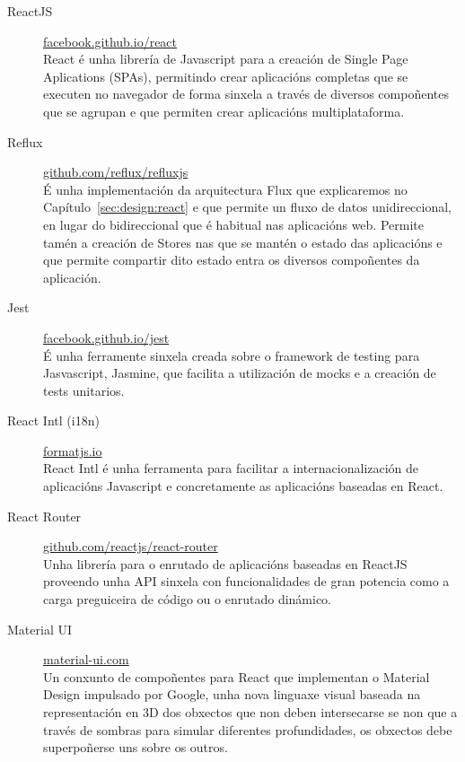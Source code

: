   \begin{description}
   \item [ReactJS] 
\href{https://facebook.github.io/react/}{facebook.github.io/react} \\ React é 
unha librería de Javascript para a 
creación de Single Page Aplications (SPAs)\cite{book:spas}, permitindo crear 
aplicacións 
completas que se executen no navegador de forma sinxela a través de diversos 
compoñentes que se agrupan e que permiten crear aplicacións multiplataforma.

   \item [Reflux] \href{https://github.com/reflux/refluxjs}{
github.com/reflux/refluxjs}\\ É unha implementación da 
arquitectura Flux que explicaremos no Capítulo~\ref{sec:design:react} e que 
permite un fluxo de datos unidireccional, en lugar do 
bidireccional que é habitual nas aplicacións web.
    Permite tamén a creación de Stores nas que se mantén o estado das aplicacións e que 
permite compartir dito estado entra os diversos compoñentes da aplicación.

   \item [Jest] 
\href{https://facebook.github.io/jest/}{facebook.github.io/jest}\\ É unha 
ferramente sinxela creada sobre o 
framework de testing para Jasvascript, Jasmine, que facilita a utilización de 
mocks e a creación de tests unitarios.

   \item [React Intl (i18n)]\href{http://formatjs.io/}{formatjs.io}\\ React 
Intl é unha 
ferramenta para facilitar a internacionalización de aplicacións Javascript e 
concretamente as 
aplicacións baseadas en React.

   \item [React 
Router]\href{https://github.com/reactjs/react-router}{
github.com/reactjs/react-router}\\ Unha 
librería para o enrutado de aplicacións baseadas en ReactJS 
proveendo unha API sinxela con funcionalidades de gran potencia como a carga preguiceira 
de código ou o enrutado dinámico.

   \item [Material UI] 
\href{http://www.material-ui.com/}{material-ui.com}\\ Un conxunto de 
compoñentes para React que implementan o Material 
Design impulsado por Google, unha nova linguaxe visual baseada na representación en 3D 
dos obxectos que non deben intersecarse se non que a través de sombras para simular 
diferentes profundidades, os obxectos debe superpoñerse uns sobre os outros.

  \end{description}

